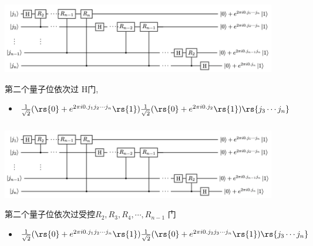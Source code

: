 \begin{frame}
    \frametitle{}
    \begin{center}
        \begin{center}
            \includegraphics[width=0.9\textwidth]{figs/37.png}
        \end{center}
    \end{center}  
    {\Bullet} 第二个量子位依次过 H门,  \\ \vspace{0.3em}
    \begin{itemize}
        \item  $\frac{1}{\sqrt{2}}(\rs{0}+e^{2\pi i 0.j_1 j_2\cdots j_n }\rs{1}) \frac{1}{\sqrt{2}}(\rs{0}+e^{2\pi i 0.j_2}\rs{1})\rs{j_3\cdots j_n}$
    \end{itemize}
\end{frame}

\begin{frame}
    \frametitle{}
    \begin{center}
        \begin{center}
            \includegraphics[width=0.9\textwidth]{figs/37.png}
        \end{center}
    \end{center}  
    第二个量子位依次过受控$R_2, R_3, R_4, \cdots, R_{n-1}$ 门  \\ \vspace{0.3em}
    \begin{itemize}
        \item  $\frac{1}{\sqrt{2}}(\rs{0}+e^{2\pi i 0.j_1 j_2\cdots j_n }\rs{1}) \frac{1}{\sqrt{2}}(\rs{0}+e^{2\pi i 0.j_2 j_3\cdots j_{n}}\rs{1})\rs{j_3\cdots j_n}$
    \end{itemize}
\end{frame}

